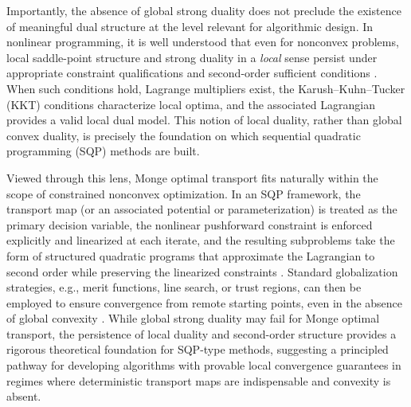 \documentclass[12pt,leqno]{amsart}
\begin{document}
Importantly, the absence of global strong duality does not preclude the existence of meaningful dual structure at the level relevant for algorithmic design. In nonlinear programming, it is well understood that even for nonconvex problems, local saddle-point structure and strong duality in a \emph{local} sense persist under appropriate constraint qualifications and second-order sufficient conditions \citep{Luenberger1969,NocedalWright2006,Bertsekas1999}. When such conditions hold, Lagrange multipliers exist, the Karush--Kuhn--Tucker (KKT) conditions characterize local optima, and the associated Lagrangian provides a valid local dual model. This notion of local duality, rather than global convex duality, is precisely the foundation on which sequential quadratic programming (SQP) methods are built.

Viewed through this lens, Monge optimal transport fits naturally within the scope of constrained nonconvex optimization. In an SQP framework, the transport map (or an associated potential or parameterization) is treated as the primary decision variable, the nonlinear pushforward constraint is enforced explicitly and linearized at each iterate, and the resulting subproblems take the form of structured quadratic programs that approximate the Lagrangian to second order while preserving the linearized constraints \citep{NocedalWright2006,Bertsekas1999}. Standard globalization strategies, e.g., merit functions, line search, or trust regions, can then be employed to ensure convergence from remote starting points, even in the absence of global convexity \citep{Luenberger1969}. While global strong duality may fail for Monge optimal transport, the persistence of local duality and second-order structure provides a rigorous theoretical foundation for SQP-type methods, suggesting a principled pathway for developing algorithms with provable local convergence guarantees in regimes where deterministic transport maps are indispensable and convexity is absent.
\end{document}
